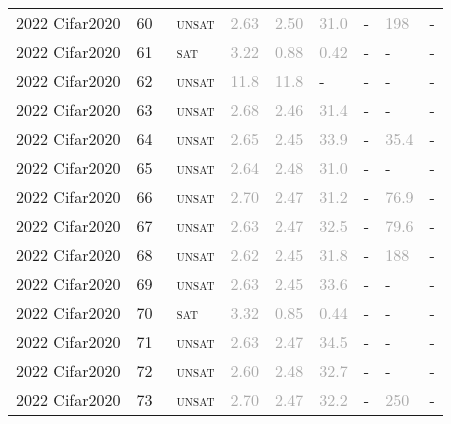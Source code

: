 \begin{center}
{\begin{longtable}{@{}lllllllll@{}}
2022 Cifar2020 & 60 & ~\textsc{unsat} & \textcolor{darkgray}{2.63} & \textcolor{darkgray}{2.50} & \textcolor{darkgray}{31.0} & - & \textcolor{darkgray}{198} & - \\
2022 Cifar2020 & 61 & ~\textsc{sat} & \textcolor{darkgray}{3.22} & \textcolor{darkgray}{0.88} & \textcolor{darkgray}{0.42} & - & - & - \\
2022 Cifar2020 & 62 & ~\textsc{unsat} & \textcolor{darkgray}{11.8} & \textcolor{darkgray}{11.8} & - & - & - & - \\
2022 Cifar2020 & 63 & ~\textsc{unsat} & \textcolor{darkgray}{2.68} & \textcolor{darkgray}{2.46} & \textcolor{darkgray}{31.4} & - & - & - \\
2022 Cifar2020 & 64 & ~\textsc{unsat} & \textcolor{darkgray}{2.65} & \textcolor{darkgray}{2.45} & \textcolor{darkgray}{33.9} & - & \textcolor{darkgray}{35.4} & - \\
2022 Cifar2020 & 65 & ~\textsc{unsat} & \textcolor{darkgray}{2.64} & \textcolor{darkgray}{2.48} & \textcolor{darkgray}{31.0} & - & - & - \\
2022 Cifar2020 & 66 & ~\textsc{unsat} & \textcolor{darkgray}{2.70} & \textcolor{darkgray}{2.47} & \textcolor{darkgray}{31.2} & - & \textcolor{darkgray}{76.9} & - \\
2022 Cifar2020 & 67 & ~\textsc{unsat} & \textcolor{darkgray}{2.63} & \textcolor{darkgray}{2.47} & \textcolor{darkgray}{32.5} & - & \textcolor{darkgray}{79.6} & - \\
2022 Cifar2020 & 68 & ~\textsc{unsat} & \textcolor{darkgray}{2.62} & \textcolor{darkgray}{2.45} & \textcolor{darkgray}{31.8} & - & \textcolor{darkgray}{188} & - \\
2022 Cifar2020 & 69 & ~\textsc{unsat} & \textcolor{darkgray}{2.63} & \textcolor{darkgray}{2.45} & \textcolor{darkgray}{33.6} & - & - & - \\
2022 Cifar2020 & 70 & ~\textsc{sat} & \textcolor{darkgray}{3.32} & \textcolor{darkgray}{0.85} & \textcolor{darkgray}{0.44} & - & - & - \\
2022 Cifar2020 & 71 & ~\textsc{unsat} & \textcolor{darkgray}{2.63} & \textcolor{darkgray}{2.47} & \textcolor{darkgray}{34.5} & - & - & - \\
2022 Cifar2020 & 72 & ~\textsc{unsat} & \textcolor{darkgray}{2.60} & \textcolor{darkgray}{2.48} & \textcolor{darkgray}{32.7} & - & - & - \\
2022 Cifar2020 & 73 & ~\textsc{unsat} & \textcolor{darkgray}{2.70} & \textcolor{darkgray}{2.47} & \textcolor{darkgray}{32.2} & - & \textcolor{darkgray}{250} & - \\

\end{longtable}}
\end{center}
